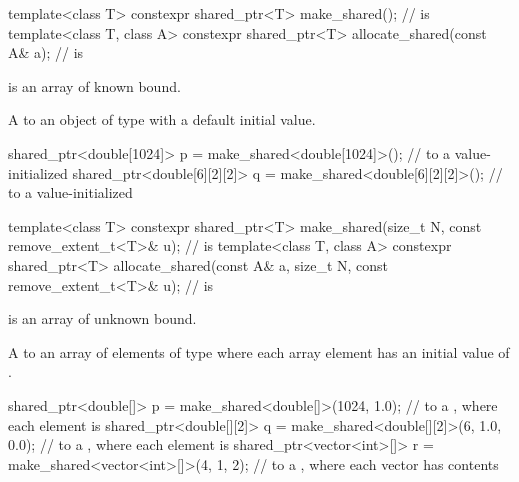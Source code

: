 %
%
\begin{itemdecl}
template<class T>
  constexpr shared_ptr<T> make_shared();                                  //  is 
template<class T, class A>
  constexpr shared_ptr<T> allocate_shared(const A& a);                    //  is 
\end{itemdecl}

\begin{itemdescr}
\pnum
\constraints
{} is an array of known bound.

\pnum
\returns
A  to an object of type 
with a default initial value.

\pnum
\begin{example}
\begin{codeblock}
shared_ptr<double[1024]> p = make_shared<double[1024]>();
  //  to a value-initialized 
shared_ptr<double[6][2][2]> q = make_shared<double[6][2][2]>();
  //  to a value-initialized 
\end{codeblock}
\end{example}
\end{itemdescr}

%
%
\begin{itemdecl}
template<class T>
  constexpr shared_ptr<T> make_shared(size_t N,
                                      const remove_extent_t<T>& u);     //  is 
template<class T, class A>
  constexpr shared_ptr<T> allocate_shared(const A& a, size_t N,
                                          const remove_extent_t<T>& u); //  is 
\end{itemdecl}

\begin{itemdescr}
\pnum
\constraints
{} is an array of unknown bound.

\pnum
\returns
A  to an array of
 elements of type 
where each array element has an initial value of .

\pnum
\begin{example}
\begin{codeblock}
shared_ptr<double[]> p = make_shared<double[]>(1024, 1.0);
  //  to a , where each element is 
shared_ptr<double[][2]> q = make_shared<double[][2]>(6, {1.0, 0.0});
  //  to a , where each  element is 
shared_ptr<vector<int>[]> r = make_shared<vector<int>[]>(4, {1, 2});
  //  to a , where each vector has contents 
\end{codeblock}
\end{example}
\end{itemdescr}


